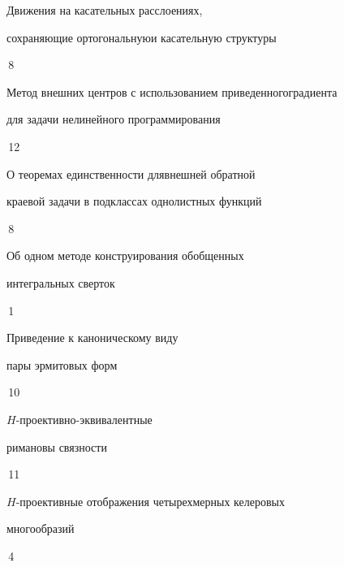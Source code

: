 



{Движения на касательных расслоениях, 


сохраняющие ортогональную\newline и касательную структуры}{\No\,8}




{Метод внешних центров с использованием приведенного\newline градиента


для задачи нелинейного программирования}{\No\,12}








{О теоремах единственности для\newline внешней обратной 


краевой задачи в подклассах однолистных функций}{\No\,8}




{Об одном методе конструирования обобщенных\newline


интегральных сверток}{\No\,1}




{Приведение к каноническому виду 


пары эрмитовых форм}{\No\,10}




{$H$-проективно-эквивалентные 


римановы связности}{\No\,11}




{$H$-проективные отображения четырехмерных келеровых\newline


многообразий}{\No\,4}


